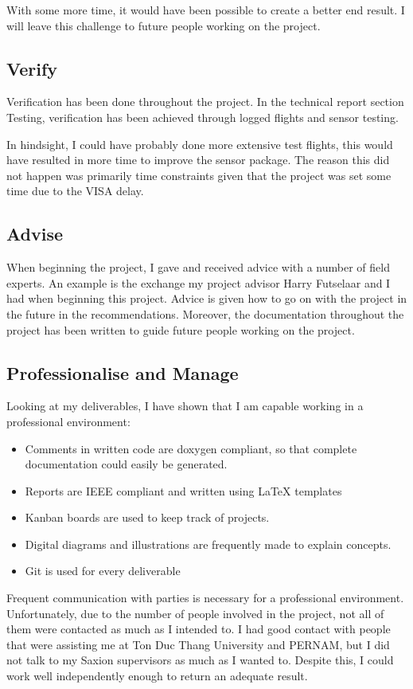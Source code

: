 \documentclass[11pt, a4paper]{article}
\begin{document}
With some more time, it would have been possible to create a better end result. I will leave this challenge to future people working on the project.

\subsection{Verify}
Verification has been done throughout the project. In the technical report section Testing\cite{tr}, verification has been achieved through logged flights and sensor testing. 

In hindsight, I could have probably done more extensive test flights, this would have resulted in more time to improve the sensor package. The reason this did not happen was primarily time constraints given that the project was set some time due to the VISA delay.

\subsection{Advise}
When beginning the project, I gave and received advice with a number of field experts. An example is the exchange my project advisor Harry Futselaar and I had when beginning this project. Advice is given how to go on with the project in the future in the recommendations.\cite{tr} Moreover, the documentation throughout the project has been written to guide future people working on the project.



\subsection{Professionalise and Manage}
Looking at my deliverables, I have shown that I am capable working in a professional environment:
\begin{itemize}
    \item Comments in written code are doxygen \cite{doxygen} compliant, so that complete documentation could easily be generated.
    \item Reports are IEEE compliant and written using \LaTeX{} templates
    \item Kanban boards are used to keep track of projects.
    \item Digital diagrams and illustrations are frequently made to explain concepts.
    \item Git is used for every deliverable
\end{itemize}

Frequent communication with parties is necessary for a professional environment. Unfortunately, due to the number of people involved in the project, not all of them were contacted as much as I intended to. I had good contact with people that were assisting me at Ton Duc Thang University and PERNAM, but I did not talk to my Saxion supervisors as much as I wanted to. Despite this, I could work well independently enough to return an adequate result.
\end{document}
